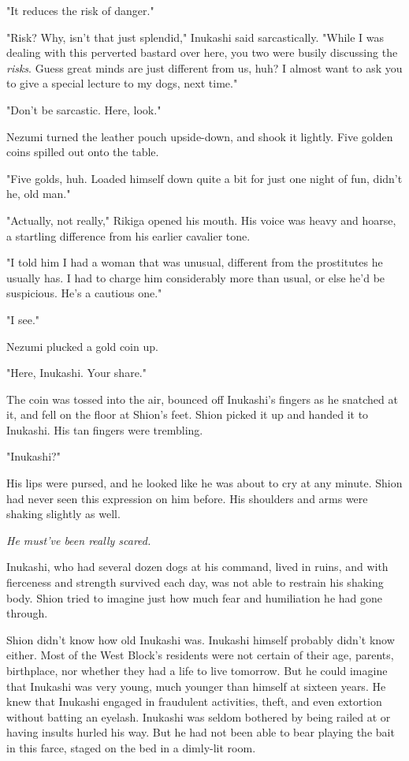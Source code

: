 "It reduces the risk of danger."

"Risk? Why, isn't that just splendid," Inukashi said sarcastically.
"While I was dealing with this perverted bastard over here, you two were
busily discussing the \emph{risks}. Guess great minds are just different from
us, huh? I almost want to ask you to give a special lecture to my dogs,
next time."

"Don't be sarcastic. Here, look."

Nezumi turned the leather pouch upside-down, and shook it lightly. Five
golden coins spilled out onto the table.

"Five golds, huh. Loaded himself down quite a bit for just one night of
fun, didn't he, old man."

"Actually, not really," Rikiga opened his mouth. His voice was heavy and
hoarse, a startling difference from his earlier cavalier tone.

"I told him I had a woman that was unusual, different from the
prostitutes he usually has. I had to charge him considerably more than
usual, or else he'd be suspicious. He's a cautious one."

"I see."

Nezumi plucked a gold coin up.

"Here, Inukashi. Your share."

The coin was tossed into the air, bounced off Inukashi's fingers as he
snatched at it, and fell on the floor at Shion's feet. Shion picked it
up and handed it to Inukashi. His tan fingers were trembling.

"Inukashi?"

His lips were pursed, and he looked like he was about to cry at any
minute. Shion had never seen this expression on him before. His
shoulders and arms were shaking slightly as well.

\emph{He must've been really scared.}

Inukashi, who had several dozen dogs at his command, lived in ruins, and
with fierceness and strength survived each day, was not able to restrain
his shaking body. Shion tried to imagine just how much fear and
humiliation he had gone through.

Shion didn't know how old Inukashi was. Inukashi himself probably didn't
know either. Most of the West Block's residents were not certain of
their age, parents, birthplace, nor whether they had a life to live
tomorrow. But he could imagine that Inukashi was very young, much
younger than himself at sixteen years. He knew that Inukashi engaged in
fraudulent activities, theft, and even extortion without batting an
eyelash. Inukashi was seldom bothered by being railed at or having
insults hurled his way. But he had not been able to bear playing the
bait in this farce, staged on the bed in a dimly-lit room.

